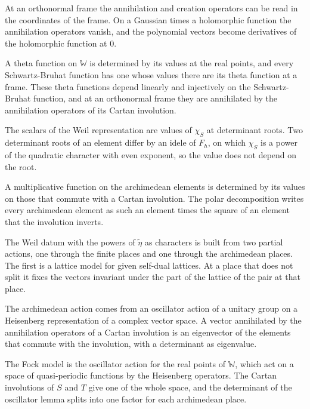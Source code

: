 At an orthonormal frame the annihilation and creation operators can be read in the coordinates of the frame.
On a Gaussian times a holomorphic function the annihilation operators vanish, and the polynomial vectors
become derivatives of the holomorphic function at $0$.

A theta function on $\mathbb W$ is determined by its values at the real points, and every Schwartz-Bruhat
function has one whose values there are its theta function at a frame. These theta functions depend linearly
and injectively on the Schwartz-Bruhat function, and at an orthonormal frame they are annihilated by the
annihilation operators of its Cartan involution.

The scalars of the Weil representation are values of $\chi_S$ at determinant roots. Two determinant roots
of an element differ by an idele of $F_h$, on which $\chi_S$ is a power of the quadratic character with
even exponent, so the value does not depend on the root.

A multiplicative function on the archimedean elements is determined by its values on those that commute
with a Cartan involution. The polar decomposition writes every archimedean element as such an element times
the square of an element that the involution inverts.

The Weil datum with the powers of $\tilde\eta$ as characters is built from two partial actions, one through the
finite places and one through the archimedean places. The first is a lattice model for given self-dual lattices. At
a place that does not split it fixes the vectors invariant under the part of the lattice of the pair at that place.

The archimedean action comes from an oscillator action of a unitary group on a Heisenberg representation of a
complex vector space. A vector annihilated by the annihilation operators of a Cartan involution is an eigenvector of
the elements that commute with the involution, with a determinant as eigenvalue.

The Fock model is the oscillator action for the real points of $\mathbb W$, which act on a space of quasi-periodic
functions by the Heisenberg operators. The Cartan involutions of $S$ and $T$ give one of the whole space, and the
determinant of the oscillator lemma splits into one factor for each archimedean place.

